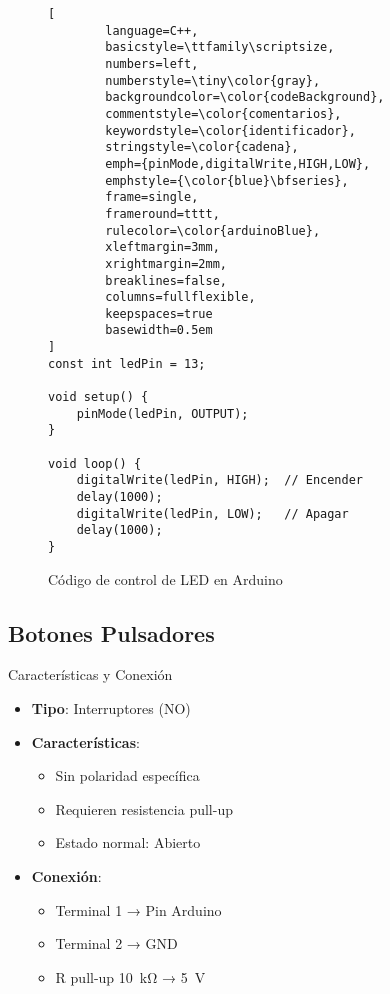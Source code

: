 \begin{figure}[H]
	\centering
	\begin{lstlisting}[
		language=C++,
		basicstyle=\ttfamily\scriptsize,
		numbers=left,
		numberstyle=\tiny\color{gray},
		backgroundcolor=\color{codeBackground},
		commentstyle=\color{comentarios},
		keywordstyle=\color{identificador},
		stringstyle=\color{cadena},
		emph={pinMode,digitalWrite,HIGH,LOW},
		emphstyle={\color{blue}\bfseries},
		frame=single,
		frameround=tttt,
		rulecolor=\color{arduinoBlue},
		xleftmargin=3mm,
		xrightmargin=2mm,
		breaklines=false,
		columns=fullflexible,
		keepspaces=true
		basewidth=0.5em 
]
const int ledPin = 13;

void setup() {
	pinMode(ledPin, OUTPUT);
}

void loop() {
	digitalWrite(ledPin, HIGH);  // Encender
	delay(1000);
	digitalWrite(ledPin, LOW);   // Apagar
	delay(1000);
}
	\end{lstlisting}
	\caption{Código de control de LED en Arduino}
	\label{fig:codigo-led}
\end{figure}

\subsection{Botones Pulsadores}
\begin{componentBox}{Características y Conexión \citep{scherz2016practical}}
	\begin{itemize}[leftmargin=*,itemsep=1pt,parsep=1pt]
		\item \textbf{Tipo}: Interruptores (NO)
		\item \textbf{Características}:
		\begin{itemize}[itemsep=0pt,parsep=0pt]
			\item Sin polaridad específica
			\item Requieren resistencia pull-up
			\item Estado normal: Abierto
		\end{itemize}
		\item \textbf{Conexión}:
		\begin{itemize}[itemsep=0pt,parsep=0pt]
			\item Terminal 1 → Pin Arduino
			\item Terminal 2 → GND
			\item R pull-up \SI{10}{\kilo\ohm} → \SI{5}{\volt}
		\end{itemize}
	\end{itemize}
\end{componentBox}

